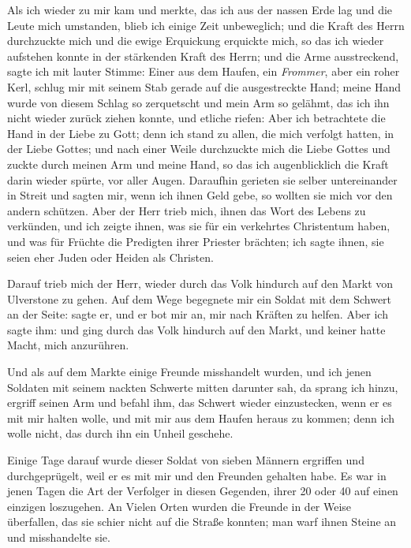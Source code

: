 Als ich wieder zu mir kam und merkte, das ich aus der nassen
Erde lag und die Leute mich umstanden, blieb ich einige
Zeit unbeweglich; und die Kraft des Herrn durchzuckte mich und
die ewige Erquickung erquickte mich, so das ich wieder aufstehen
konnte in der stärkenden Kraft des Herrn; und die Arme 
ausstreckend, sagte ich mit lauter Stimme:  Einer aus
dem Haufen, ein \textit{Frommer}, aber ein roher Kerl, schlug mir
mit seinem Stab gerade auf die ausgestreckte Hand; meine Hand
wurde von diesem Schlag so zerquetscht und mein Arm so 
gelähmt, das ich ihn nicht wieder zurück ziehen konnte, und etliche
riefen:  Aber ich betrachtete die Hand in der
Liebe zu Gott; denn ich stand zu allen, die mich verfolgt hatten,
in der Liebe Gottes; und nach einer Weile durchzuckte mich die
Liebe Gottes und zuckte durch meinen Arm und meine Hand,
so das ich augenblicklich die Kraft darin wieder spürte, vor aller
Augen. Daraufhin gerieten sie 
selber untereinander in Streit und
sagten mir, wenn ich ihnen Geld gebe, so wollten sie mich vor
den andern schützen. Aber der Herr trieb mich, ihnen das Wort
des Lebens zu verkünden, und ich zeigte ihnen, was sie für ein
verkehrtes Christentum haben, und was für Früchte die Predigten
ihrer Priester brächten; ich sagte ihnen, sie seien 
eher Juden oder Heiden als Christen. 


Darauf trieb mich der Herr, wieder durch
das Volk hindurch auf den Markt von Ulverstone zu gehen. Auf
dem Wege begegnete mir ein Soldat mit dem Schwert an der
Seite:  sagte er, 
und er bot mir
an, mir nach Kräften zu helfen. Aber ich sagte ihm: 
 und ging 
durch das Volk hindurch auf
den Markt, und keiner hatte Macht, mich anzurühren. 

Und als
auf dem Markte einige Freunde misshandelt wurden, und ich jenen
Soldaten mit seinem 
nackten Schwerte 
mitten darunter sah, da
sprang ich hinzu, ergriff seinen Arm und befahl ihm, das Schwert
wieder einzustecken, wenn er es mit mir halten wolle, und mit
mir aus dem Haufen heraus zu kommen; denn ich wolle nicht,
das durch ihn ein Unheil geschehe. 

Einige Tage darauf wurde
dieser Soldat von sieben Männern ergriffen und durchgeprügelt,
weil er es mit mir und den Freunden gehalten habe. Es war
in jenen Tagen die Art der Verfolger in diesen Gegenden,
ihrer 20 oder 40 auf einen einzigen loszugehen. An Vielen Orten
wurden die Freunde in der Weise überfallen, das sie schier nicht
auf die Straße konnten; man warf ihnen Steine an und 
misshandelte sie. 

